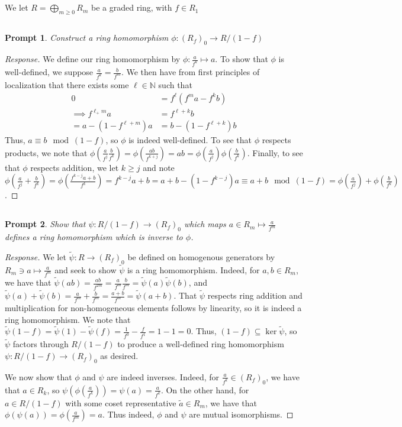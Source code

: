 \documentclass[english,letter,doublesided]{article}
\newcommand{\NN}{\mathbb{N}}
\newcommand{\prob}[1]{\setcounter{section}{#1-1}\section{}}
\newcommand{\prt}[1]{\setcounter{subsection}{#1-1}\subsection{}}
\newtheorem*{prompt*}{Prompt}
\theoremstyle{remark}
\theoremstyle{definition}
\newcommand{\tpsi}{{\tilde{\psi}}}
\begin{document}
\prob{3} We let $R=\bigoplus_{m\geq 0} R_m$ be a graded ring, with $f\in R_1$ \prt{1}\begin{prompt*}
	Construct a ring homomorphism $\phi: (R_f)_0\to R/(1-f)$
\end{prompt*} 
\begin{proof}[Response]
	We define our ring homomorphism by $\phi:\frac{a}{f^k}\mapsto a$. To show that $\phi$ is well-defined, we suppose $\frac{a}{f^k}=\frac{b}{f^m}$. We then have from first principles of localization that there exists some $\ell\in \NN$ such that \begin{align*}0&=f^{\ell}(f^ma-f^kb)\\
\implies f^{\ell_+m}a&=f^{\ell+k}b\\
=a-(1-f^{\ell+m})a&=b-(1-f^{\ell+k})b
	\end{align*} 
	Thus, $a\equiv b\mod (1-f)$, so $\phi$ is indeed well-defined. To see that $\phi$ respects products, we note that $\phi(\frac{a}{f^j}\frac{b}{f^k})=\phi(\frac{ab}{f^{k+j}})=ab=\phi(\frac{a}{f^j})\phi(\frac{b}{f^k})$. Finally, to see that $\phi$ respects addition, we let $k\geq j$ and note $\phi(\frac{a}{f^j}+\frac{b}{f^k})=\phi(\frac{f^{k-j}a+b}{f^k})=f^{k-j}a+b=a+b-(1-f^{k-j})a\equiv a+b \mod (1-f)=\phi(\frac{a}{f^j})+\phi(\frac{b}{f^k})$.
\end{proof}
\prt{2}
\begin{prompt*}
	Show that $\psi: R/(1-f)\to (R_f)_0$ which maps $a\in R_m\mapsto \frac{a}{f^m}$ defines a ring homomorphism which is inverse to $\phi$.
\end{prompt*}
\begin{proof}[Response]
We let $\tpsi:R\to (R_f)_0$	be defined on homogenous generators by $R_m\ni a\mapsto \frac{a}{f^m}$ and seek to show $\tpsi$ is a ring homomorphism. Indeed, for $a,b\in R_m$, we have that $\tpsi(ab)=\frac{ab}{f^{2m}}=\frac{a}{f^m}\frac{b}{f^m}=\tpsi(a)\tpsi(b)$, and $\tpsi(a)+\tpsi(b)=\frac{a}{f^m}+\frac{b}{f^m}=\frac{a+b}{f^m}=\tpsi(a+b)$. That $\tpsi$ respects ring addition and multiplication for non-homogeneous elements follows by linearity, so it is indeed a ring homomorphism. We note that $\tpsi(1-f)=\tpsi(1)-\tpsi(f)=\frac{1}{f^0}-\frac{f}{f^1}=1-1=0$. Thus, $(1-f)\subseteq \ker \tpsi$, so $\tpsi$ factors through $R/(1-f)$ to produce a well-defined ring homomorphism $\psi:R/(1-f)\to (R_f)_0$ as desired.

We now show that $\phi$ and $\psi$ are indeed inverses. Indeed, for $\frac{a}{f^k}\in (R_f)_0$, we have that $a\in R_k$, so $\psi(\phi(\frac{a}{f^k}))=\psi(a)=\frac{a}{f^k}$. On the other hand, for $a\in R/(1-f)$ with some coset representative $\tilde a\in R_m$, we have that $\phi(\psi(a))=\phi(\frac{a}{f^m})=a$. Thus indeed, $\phi$ and $\psi$ are mutual isomorphisms.
\end{proof}
\end{document}
